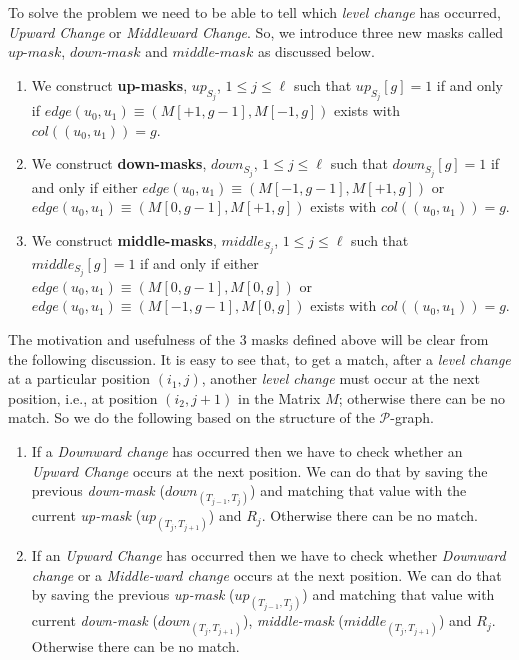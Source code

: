 \documentclass{llncs}
\begin{document}
{To solve the problem we need to be able to tell which \emph{level change} has occurred, \emph{Upward Change} or \emph{Middleward Change}. So, we introduce three new masks called $up$-$mask$, $down$-$mask$ and $middle$-$mask$ as discussed below. 

\begin{enumerate}
\item We construct \textbf{up-masks}, $up_{S_j}$, $1\leq j\leq \ell$ such that $up_{S_j}[g] = 1$ if and only if $edge(u_0,u_1) \equiv (M[+1,g-1],M[-1,g])$ exists with $col((u_0,u_1)) = g$. 


\item We construct \textbf{down-masks}, $down_{S_j}$, $1\leq j\leq \ell$ such that $down_{S_j}[g] = 1$ if and only if either $edge(u_0,u_1) \equiv (M[-1,g-1],M[+1,g])$ or $edge(u_0,u_1) \equiv (M[0,g-1],M[+1,g])$ exists with $col((u_0,u_1)) = g$.  


\item We construct \textbf{middle-masks}, $middle_{S_j}$, $1\leq j\leq \ell$ such that $middle_{S_j}[g] = 1$ if and only if either $edge(u_0,u_1) \equiv (M[0,g-1],M[0,g])$ or $edge(u_0,u_1) \equiv (M[-1,g-1],M[0,g])$ exists with $col((u_0,u_1)) = g$.

\end{enumerate}




The motivation and usefulness of the $3$ masks defined above will be clear from the following discussion.
It is easy to see that, to get a match, after a \emph{level change} at a particular position $(i_1,j)$, another \emph{level change} must occur at the next position, i.e., at position $(i_2,j+1)$ in the Matrix $M$; otherwise there can be no match. So we do the following based on the structure of the $\mathcal P$-graph.


\begin{enumerate}

\item If a \emph{Downward change} has occurred  then we have to check whether an \emph{Upward Change} occurs at the next position. We can do that by saving the previous \emph{down-mask} ($down_{(T_{j-1},T_{j})}$) and matching that value with the current \emph{up-mask} ($up_{(T_{j},T_{j+1})}$) and $R_j$. Otherwise there can be no match.


\item If an \emph{Upward Change} has occurred then we have to check whether \emph{Downward change} or a \emph{Middle-ward change} occurs at the next position. We can do that by saving the previous \emph{up-mask} ($up_{(T_{j-1},T_{j})}$) and matching that value with current \emph{down-mask}  ($down_{(T_{j},T_{j+1})}$), \emph{middle-mask} ($middle_{(T_{j},T_{j+1})}$) and $R_j$. Otherwise there can be no match.



\end{enumerate}}
\end{document}
